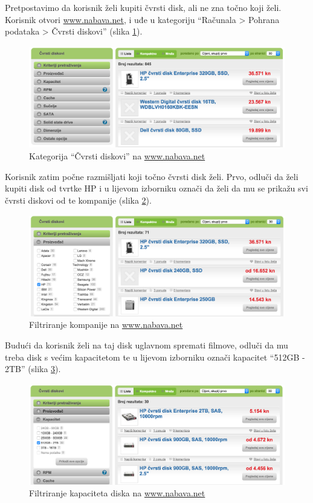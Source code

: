 \documentclass[a4paper,twoside,12pt]{scrreprt}
\begin{document}
Pretpostavimo da korisnik želi kupiti čvrsti disk, ali ne zna točno koji želi. Korisnik otvori \url{www.nabava.net}, i uđe u kategoriju ``Računala > Pohrana podataka > Čvrsti diskovi'' (slika \ref{nabava1}).

\begin{figure}[H]
  \centering
  \includegraphics[width=\textwidth]{nabava1}
  \caption{Kategorija ``Čvrsti diskovi'' na \url{www.nabava.net}}
  \label{nabava1}
\end{figure}

Korisnik zatim počne razmišljati koji točno čvrsti disk želi. Prvo, odluči da želi kupiti disk od tvrtke HP i u lijevom izborniku označi da želi da mu se prikažu svi čvrsti diskovi od te kompanije (slika \ref{nabava2}).

\begin{figure}[H]
  \centering
  \includegraphics[width=\textwidth]{nabava2}
  \caption{Filtriranje kompanije na \url{www.nabava.net}}
  \label{nabava2}
\end{figure}

Budući da korisnik želi na taj disk uglavnom spremati filmove, odluči da mu treba disk s većim kapacitetom te u lijevom izborniku označi kapacitet ``512GB - 2TB'' (slika \ref{nabava3}).

\begin{figure}[H]
  \centering
  \includegraphics[width=\textwidth]{nabava3}
  \caption{Filtriranje kapaciteta diska na \url{www.nabava.net}}
  \label{nabava3}
\end{figure}
\end{document}
